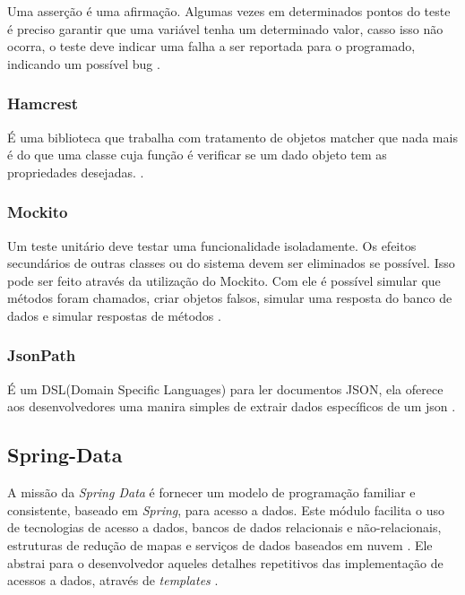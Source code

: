 Uma asserção é uma afirmação. Algumas vezes em determinados pontos do teste é preciso garantir que uma variável tenha um determinado valor, casso isso não ocorra, o teste deve indicar uma falha a ser reportada para o programado, indicando um possível bug \cite{junit:2017}.
	
\subsubsection{Hamcrest}\label{subsec:Hamcrest}

	É uma biblioteca que trabalha com tratamento de objetos matcher que nada mais é do que uma classe cuja função é verificar se um dado objeto tem as propriedades desejadas. \cite{hamcrest:2017}.

\subsubsection{Mockito}\label{subsec:Mockito}
	
	Um teste unitário deve testar uma funcionalidade isoladamente. Os efeitos secundários de outras classes ou do sistema devem ser eliminados  se possível. Isso pode ser feito através da utilização do Mockito. Com ele é possível simular que métodos foram chamados, criar objetos falsos, simular uma resposta do banco de dados e simular respostas de métodos \cite{mockito:2017}.

\subsubsection{JsonPath}\label{subsec:JsonPath}

	É um  DSL(Domain Specific Languages) para ler documentos JSON, ela oferece aos desenvolvedores uma manira simples de extrair dados específicos de um json \cite{JsonPath:2017}.


\subsection{Spring-Data}\label{subsec:SpringData}

A missão da \textit{Spring Data} é fornecer um modelo de programação familiar e consistente, baseado em \textit{Spring}, para acesso a dados. Este módulo facilita o uso de tecnologias de acesso a dados, bancos de dados relacionais e não-relacionais, estruturas de redução de mapas e serviços de dados baseados em nuvem \cite{springData:2017}. Ele abstrai para o desenvolvedor aqueles detalhes repetitivos das implementação de acessos a dados, através de \textit{templates} \cite{Weissmann:2012}.

